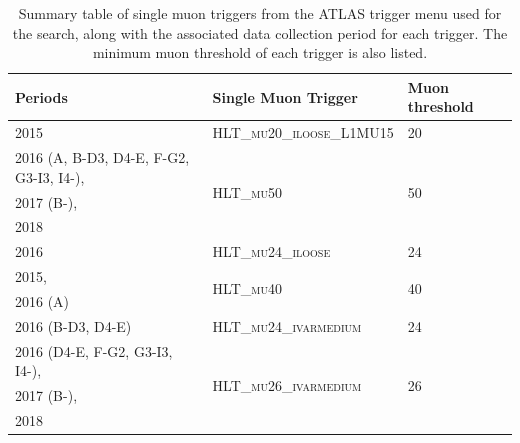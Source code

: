 \begin{table}[ht]
\caption{Summary table of single muon triggers from the ATLAS trigger menu used for the search, along with the associated data collection period for each trigger. The minimum muon \pt threshold of each trigger is also listed.}
\label{tab:summary_muon_triggers_used}
\footnotesize{
	\begin{center}
	\begin{tabular}{l l l }
		\toprule
			\textbf{Periods} & \textbf{Single Muon Trigger} & \textbf{Muon \pt threshold} \\
			\midrule
			\midrule
			2015 & \textsc{HLT\_mu20\_iloose\_L1MU15} & 20 \GeV \\
			\midrule
			2016 (A, B-D3, D4-E, F-G2, G3-I3, I4-), & \multirow{3}{*}{\textsc{HLT\_mu50}} & \multirow{3}{*}{50 \GeV} \\
			2017 (B-), & & \\
			2018 & & \\
			\midrule
			2016 & \textsc{HLT\_mu24\_iloose} & 24 \GeV \\
			\midrule
			2015, & \multirow{2}{*}{\textsc{HLT\_mu40}} & \multirow{2}{*}{40 \GeV} \\
			2016 (A) & & \\
			\midrule
			2016 (B-D3, D4-E) & \textsc{HLT\_mu24\_ivarmedium} & 24 \GeV \\
			\midrule
			2016 (D4-E, F-G2, G3-I3, I4-),  & \multirow{3}{*}{\textsc{HLT\_mu26\_ivarmedium}} & \multirow{3}{*}{26 \GeV} \\
			2017 (B-), \\
			2018 \\
		\bottomrule
	\end{tabular}
	\end{center}
	}
\end{table}

